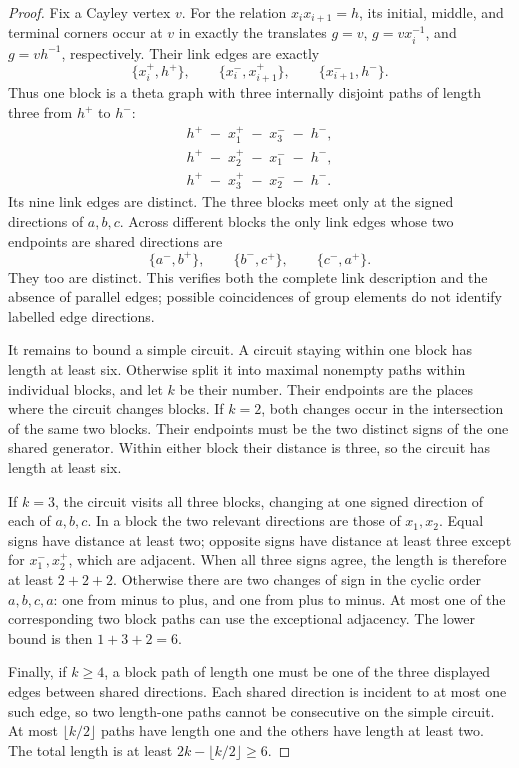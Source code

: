 \begin{proof}
Fix a Cayley vertex $v$.  For the relation $x_ix_{i+1}=h$, its
initial, middle, and terminal corners occur at $v$ in exactly the
translates
$g=v$, $g=vx_i^{-1}$, and $g=vh^{-1}$, respectively.  Their link
edges are exactly
\begin{equation}\label{eq:link-edges}
  \{x_i^+,h^+\},\qquad
  \{x_i^-,x_{i+1}^+\},\qquad
  \{x_{i+1}^-,h^-\}.
\end{equation}
Thus one block is a theta graph with three internally disjoint paths
of length three from $h^+$ to $h^-$:
\[
 \begin{gathered}
 h^+\; -\; x_1^+\; -\; x_3^-\; -\; h^-,\\
 h^+\; -\; x_2^+\; -\; x_1^-\; -\; h^-,\\
 h^+\; -\; x_3^+\; -\; x_2^-\; -\; h^-.
 \end{gathered}
\]
Its nine link edges are distinct.
The three blocks meet only at the signed directions of $a,b,c$.
Across different blocks the only link edges whose two endpoints are
shared directions are
\[
  \{a^-,b^+\},\qquad \{b^-,c^+\},\qquad \{c^-,a^+\}.
\]
They too are distinct.  This verifies both the complete link
description and the absence of parallel edges; possible coincidences
of group elements do not identify labelled edge directions.

It remains to bound a simple circuit.  A circuit staying within one
block has length at least six.  Otherwise split it into maximal
nonempty paths within individual blocks, and let $k$ be their number.
Their endpoints are the places where the circuit changes blocks.
If $k=2$, both changes occur in the intersection of the same two
blocks.  Their endpoints must be the two distinct signs of the one
shared generator.  Within either block their distance is three, so
the circuit has length at least six.

If $k=3$, the circuit visits all three blocks, changing at one signed
direction of each of $a,b,c$.  In a block the two relevant directions
are those of $x_1,x_2$.  Equal signs have distance at least two;
opposite signs have distance at least three except for
$x_1^-,x_2^+$, which are adjacent.  When all three signs agree, the
length is therefore at least $2+2+2$.  Otherwise there are two
changes of sign in the cyclic order $a,b,c,a$: one from minus to
plus, and one from plus to minus.  At most one of the corresponding
two block paths can use the exceptional adjacency.  The lower bound
is then $1+3+2=6$.

Finally, if $k\ge4$, a block path of length one must be one of the
three displayed edges between shared directions.  Each shared
direction is incident to at most one such edge, so two length-one
paths cannot be consecutive on the simple circuit.  At most
$\lfloor k/2\rfloor$ paths have length one and the others have length
at least two.  The total length is at least
$2k-\lfloor k/2\rfloor\ge6$.
\end{proof}

